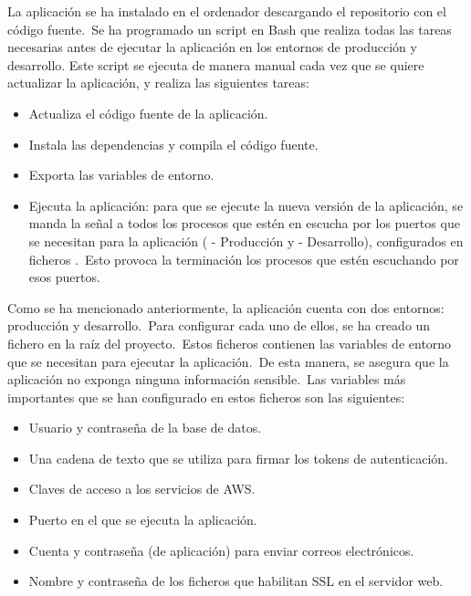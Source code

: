 
La aplicación se ha instalado en el ordenador descargando el repositorio con el código fuente.\ Se ha programado un
script
en Bash que realiza todas las tareas necesarias antes de ejecutar la aplicación en los entornos de producción y
desarrollo.
Este script se ejecuta de manera manual cada vez que se quiere actualizar la aplicación, y realiza las siguientes
tareas:
\begin{itemize}
	\item Actualiza el código fuente de la aplicación.
	\item Instala las dependencias y compila el código fuente.
	\item Exporta las variables de entorno.
	\item Ejecuta la aplicación: para que se ejecute la nueva versión de la aplicación, se manda la señal
	 a todos los procesos que estén en escucha por los puertos que se necesitan para la aplicación
	( - Producción y
	 - Desarrollo), configurados en ficheros .\ Esto provoca la terminación los procesos
	que estén escuchando por esos puertos.
\end{itemize}
\label{itm:script_tasks}

Como se ha mencionado anteriormente, la aplicación cuenta con dos entornos: producción y desarrollo.\ Para configurar
cada uno de ellos, se ha creado un fichero  en la raíz del proyecto.\ Estos ficheros contienen las
variables de entorno que se necesitan para ejecutar la aplicación.\ De esta manera, se asegura que la aplicación
no exponga ninguna información sensible.\ Las variables más importantes
que se han configurado en estos ficheros son las siguientes:
\begin{itemize}
	\item Usuario y contraseña de la base de datos.
	\item Una cadena de texto que se utiliza para firmar los tokens de autenticación.
	\item Claves de acceso a los servicios de AWS\@.
	\item Puerto en el que se ejecuta la aplicación.
	\item Cuenta y contraseña (de aplicación) para enviar correos electrónicos.
	\item Nombre y contraseña de los ficheros que habilitan SSL en el servidor web.
\end{itemize}
\label{itm:env_variables}

